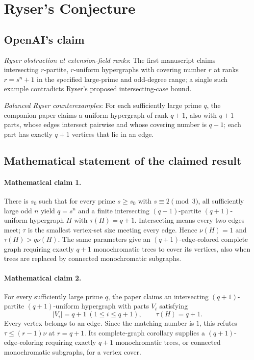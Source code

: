 \documentclass[11pt]{article}
\begin{document}
\section*{Ryser's Conjecture}

\subsection{OpenAI's claim}
\textit{Ryser obstruction at extension-field ranks}: The first manuscript claims intersecting $r$-partite, $r$-uniform hypergraphs with covering number $r$ at ranks $r=s^n+1$ in the specified large-prime and odd-degree range; a single such example contradicts Ryser’s proposed intersecting-case bound.

\textit{Balanced Ryser counterexamples}: For each sufficiently large prime $q$, the companion paper claims a uniform hypergraph of rank $q+1$, also with $q+1$ parts, whose edges intersect pairwise and whose covering number is $q+1$; each part has exactly $q+1$ vertices that lie in an edge.

\subsection{Mathematical statement of the claimed result}
\paragraph{Mathematical claim 1.} There is $s_0$ such that for every prime $s\ge s_0$ with $s\equiv2\pmod3$, all sufficiently large odd $n$ yield $q=s^n$ and a finite intersecting $(q+1)$-partite $(q+1)$-uniform hypergraph $H$ with $\tau(H)=q+1$. Intersecting means every two edges meet; $\tau$ is the smallest vertex-set size meeting every edge. Hence $\nu(H)=1$ and $\tau(H)>q\nu(H)$. The same parameters give an $(q+1)$-edge-colored complete graph requiring exactly $q+1$ monochromatic trees to cover its vertices, also when trees are replaced by connected monochromatic subgraphs.

\paragraph{Mathematical claim 2.} For every sufficiently large prime $q$, the paper claims an intersecting $(q+1)$-partite $(q+1)$-uniform hypergraph with parts $V_i$ satisfying \[|V_i|=q+1\ (1\le i\le q+1),\qquad\tau(H)=q+1.\] Every vertex belongs to an edge. Since the matching number is $1$, this refutes $\tau\le(r-1)\nu$ at $r=q+1$. Its complete-graph corollary supplies a $(q+1)$-edge-coloring requiring exactly $q+1$ monochromatic trees, or connected monochromatic subgraphs, for a vertex cover.
\end{document}
